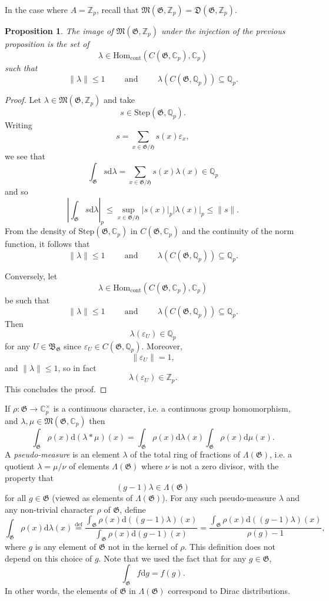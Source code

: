 \documentclass[twoside,10pt]{article}
\newtheorem{prop}{Proposition}
\newcommand{\rarr}{\rightarrow}
\newcommand{\myand}{\hspace{1cm}\text{and}\hspace{1cm}}
\newcommand{\Z}{\mathbb{Z}}
\newcommand{\Q}{\mathbb{Q}}
\newcommand{\C}{\mathbb{C}}
\newcommand{\B}{\mathfrak{B}}
\newcommand{\Gfrak}{\mathfrak{G}}
\newcommand{\Hfrak}{\mathfrak{H}}
\newcommand{\eqdef}{\overset{\text{def}}{=}}
\newcommand{\Dist}{\mathfrak{D}}
\newcommand{\Meas}{\mathfrak{M}}
\newcommand{\Hom}{\text{Hom}}
\newcommand{\Step}{\text{Step}}
\newcommand{\charf}{\varepsilon}
\renewcommand{\d}{\text{d}}
\begin{document}
In the case where $A=\Z_p$, recall that $\Meas(\Gfrak,\Z_p)=\Dist(\Gfrak,\Z_p)$.

\begin{prop}
	The image of $\Meas(\Gfrak,\Z_p)$ under the injection of the previous proposition is the set of
	\[\lambda\in \Hom_{\text{cont}}(C(\Gfrak,\C_p),\C_p)\]
	such that
	\[\parallel\lambda\parallel\leq 1\hspace{1cm}\text{and}\hspace{1cm}\lambda(C(\Gfrak,\Q_p))\subseteq\Q_p.\]
\end{prop}
\begin{proof}
	Let $\lambda\in\Meas(\Gfrak,\Z_p)$ and take
	\[s\in\Step(\Gfrak,\Q_p).\]
	Writing
	\[s=\sum_{x\in\Gfrak/\Hfrak}s(x)\charf_x,\]
	we see that
	\[\int_{\Gfrak}s\d\lambda=\sum_{x\in\Gfrak/\Hfrak}s(x)\lambda(x)\in\Q_p\]
	and so
	\[\left |\int_{\Gfrak}s\d\lambda\right |_p\leq\sup_{x\in\Gfrak/\Hfrak}|s(x)|_p|\lambda(x)|_p\leq\parallel s\parallel.\]
	From the density of $\Step(\Gfrak,\C_p)$ in $C(\Gfrak,\C_p)$ and the continuity of the norm function, it follows that
	\[\parallel\lambda\parallel\leq 1\myand\lambda(C(\Gfrak,\Q_p))\subseteq\Q_p.\]
	
	Conversely, let
	\[\lambda\in \Hom_{\text{cont}}(C(\Gfrak,\C_p),\C_p)\]
	be such that
	\[\parallel\lambda\parallel\leq 1\hspace{1cm}\text{and}\hspace{1cm}\lambda(C(\Gfrak,\Q_p))\subseteq\Q_p.\]
	Then
	\[\lambda(\charf_U)\in\Q_p\]
	for any $U\in\B_\Gfrak$ since $\charf_U\in C(\Gfrak,\Q_p)$. Moreover,
	\[\parallel\charf_U\parallel=1,\]
	and $\parallel\lambda\parallel\leq 1$, so in fact
	\[\lambda(\charf_U)\in\Z_p.\]
	This concludes the proof.	
\end{proof}

If $\rho:\Gfrak\rarr\C_p^\times$ is a continuous character, i.e. a continuous group homomorphism, and $\lambda,\mu\in\Meas(\Gfrak,\C_p)$ then
\[\int_{\Gfrak}\rho(x)\d(\lambda\ast\mu)(x)=\int_\Gfrak\rho(x)\d\lambda(x)\int_\Gfrak\rho(x)\d\mu(x).\]
A \emph{pseudo-measure} is an element $\lambda$ of the total ring of fractions of $\Lambda(\Gfrak)$, i.e. a quotient $\lambda=\mu/\nu$ of elements $\Lambda(\Gfrak)$ where $\nu$ is not a zero divisor, with the property that
\[(g-1)\lambda\in\Lambda(\Gfrak)\]
for all $g\in\Gfrak$ (viewed as elements of $\Lambda(\Gfrak)$). For any such pseudo-measure $\lambda$ and any non-trivial character $\rho$ of $\Gfrak$, define
\[\int_\Gfrak\rho(x)\d\lambda(x)\eqdef\frac{\int_\Gfrak\rho(x)\d((g-1)\lambda)(x)}{\int_\Gfrak\rho(x)\d(g-1)(x)}=\frac{\int_\Gfrak\rho(x)\d((g-1)\lambda)(x)}{\rho(g)-1},\]
where $g$ is any element of $\Gfrak$ not in the kernel of $\rho$. This definition does not depend on this choice of $g$. Note that we used the fact that for any $g\in\Gfrak$,
\[\int_\Gfrak f\d g=f(g).\]
In other words, the elements of $\Gfrak$ in $\Lambda(\Gfrak)$ correspond to Dirac distributions.
\end{document}
